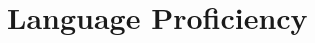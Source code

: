 \documentclass[%
               doublesided,
               paper=a4,
               fontsize=10.5pt
              ]{my-resume}
\begin{document}
{\section{Language Proficiency}

  
    

    

    
    
    



    

}
\end{document}
